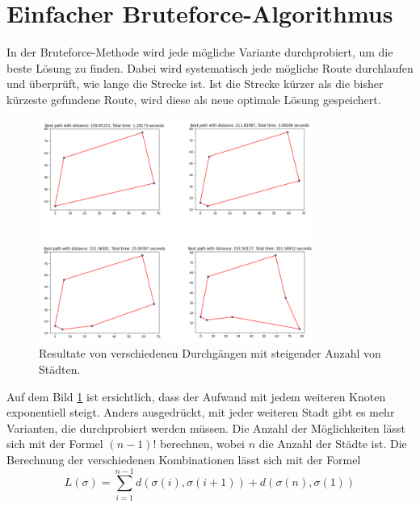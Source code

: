 %
%
%
%
\section{Einfacher Bruteforce-Algorithmus
  \label{buch:paper:varalg:section:bruteforce}}
In der Bruteforce-Methode wird jede mögliche Variante durchprobiert,
um die beste Lösung zu finden. Dabei wird systematisch jede mögliche
Route durchlaufen und überprüft, wie lange die Strecke ist.
Ist die Strecke kürzer als die bisher kürzeste gefundene Route,
wird diese als neue optimale Lösung gespeichert.
\begin{figure}
    \centering
    \includegraphics[width=0.8\textwidth]{papers/varalg/images/teil2/02BruteforceMethode.png}
    \caption{Resultate von verschiedenen Durchgängen mit steigender Anzahl von Städten.
        \label{fig:results_bruteforce}}
\end{figure}
Auf dem Bild \ref{fig:results_bruteforce} ist ersichtlich, dass der
Aufwand mit jedem weiteren Knoten exponentiell steigt. Anders
%
ausgedrückt, mit jeder weiteren Stadt gibt es mehr Varianten, die
durchprobiert werden müssen. Die Anzahl der Möglichkeiten lässt sich
mit der Formel \((n-1)!\) berechnen, wobei \(n\) die Anzahl der Städte ist.
Die Berechnung der verschiedenen Kombinationen lässt sich mit der
Formel
\begin{equation}
    L(\sigma)
    =
    \sum_{i=1}^{n-1} d(\sigma(i), \sigma(i+1)) + d(\sigma(n), \sigma(1))
    \label{eq:bruteforce_min_formula}
\end{equation}
